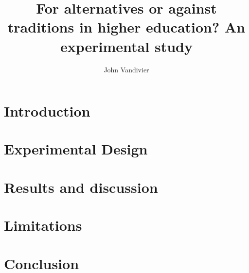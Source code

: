 \documentclass[review]{elsarticle}
\begin{document}
\begin{frontmatter}

\title{
    For alternatives or against traditions in higher education? An experimental study %
}

\author[mymainaddress]{John Vandivier}
\address[mymainaddress]{4400 University Dr, Fairfax, VA 22030}


\begin{abstract}
\end{abstract}

\begin{keyword}
\MSC[2010] %
\end{keyword}

\end{frontmatter}

\pagebreak
\linenumbers
        
    \section{Introduction}
    

    \section{Experimental Design}

    

    \section{Results and discussion}



    \section{Limitations}



    \section{Conclusion} %


    
    
\end{document}
